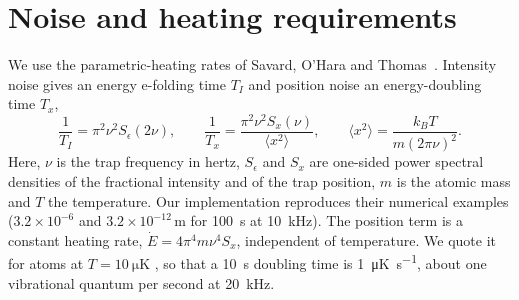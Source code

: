 \documentclass[11pt]{article}
\begin{document}
\section{Noise and heating requirements}
\label{sec:noise}

We use the parametric-heating rates of Savard, O'Hara and Thomas~\cite{Savard1997}. Intensity noise
gives an energy e-folding time $T_I$ and position noise an energy-doubling time $T_x$,
\begin{equation}
  \frac{1}{T_I} = \pi^{2}\nu^{2} S_\epsilon(2\nu), \qquad
  \frac{1}{T_x} = \frac{\pi^{2}\nu^{2} S_x(\nu)}{\langle x^{2}\rangle}, \qquad
  \langle x^{2}\rangle = \frac{k_B T}{m (2\pi\nu)^{2}}.
  \label{eq:savard}
\end{equation}
Here, $\nu$ is the trap frequency in hertz, $S_\epsilon$ and $S_x$ are one-sided power spectral
densities of the fractional intensity and of the trap position, $m$ is the atomic mass and $T$ the
temperature. Our implementation reproduces their numerical examples ($3.2\times10^{-6}$\rtHz{} and
$3.2\times10^{-12}$\,m\rtHz{} for \SI{100}{\second} at \SI{10}{\kilo\hertz}). The position term is a
constant heating rate, $\dot E = 4\pi^{4} m \nu^{4} S_x$, independent of temperature. We quote it for
atoms at $T = \SI{10}{\micro\kelvin}$ ,
so that a \SI{10}{\second} doubling time is \SI{1}{\micro\kelvin\per\second}, about one vibrational
quantum per second at \SI{20}{\kilo\hertz}.
\end{document}
